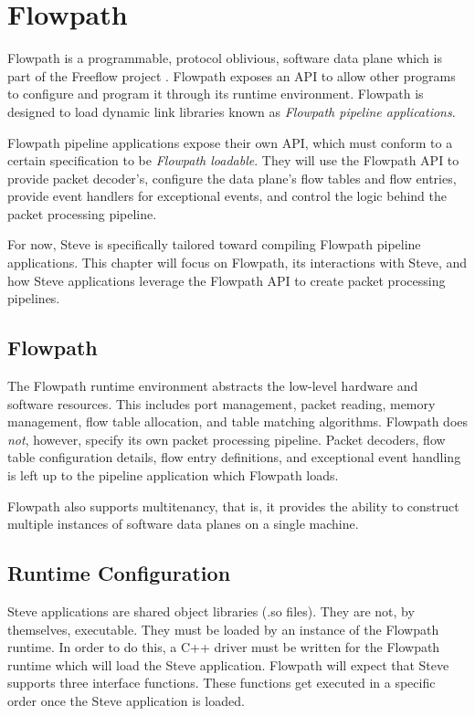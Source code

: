 \chapter{Flowpath} \label{ch:flowpath}

Flowpath is a programmable, protocol oblivious, software data plane which is part of the Freeflow project \cite{freeflow_software}. Flowpath exposes an API to allow other programs to configure and program it through its runtime environment. Flowpath is designed to load dynamic link libraries known as \textit{Flowpath pipeline applications}. 

Flowpath pipeline applications expose their own API, which must conform to a certain specification to be \textit{Flowpath loadable}. 
They will use the Flowpath API to provide packet decoder's, configure the data plane's flow tables and flow entries, provide event handlers for exceptional events, and control the logic behind the packet processing pipeline.

For now, Steve is specifically tailored toward compiling Flowpath pipeline applications. This chapter will focus on Flowpath, its interactions with Steve, and how Steve applications leverage the Flowpath API to create packet processing pipelines.

\section{Flowpath}

The Flowpath runtime environment abstracts the low-level hardware and software resources. This includes port management, packet reading, memory management, flow table allocation, and table matching algorithms. Flowpath does \textit{not}, however, specify its own packet processing pipeline. Packet decoders, flow table configuration details, flow entry definitions, and exceptional event handling is left up to the pipeline application which Flowpath loads.

Flowpath also supports multitenancy, that is, it provides the ability to construct multiple instances of software data planes on a single machine.

\section{Runtime Configuration} \label{config_guide}

Steve applications are shared object libraries (.so files). They are not, by themselves, executable. They must be loaded by an instance of the Flowpath runtime. In order to do this, a C++ driver must be written for the Flowpath runtime which will load the Steve application. Flowpath will expect that Steve supports three interface functions. These functions get executed in a specific order once the Steve application is loaded.

